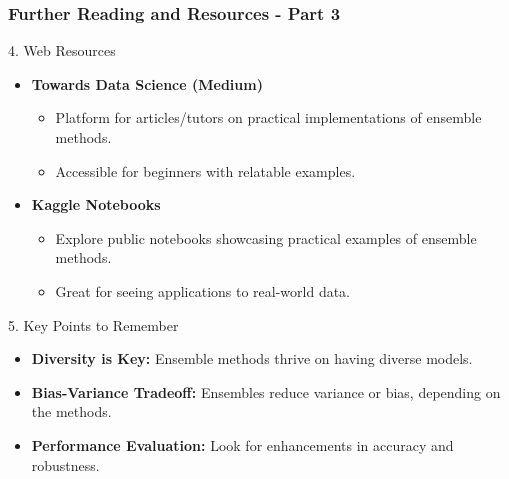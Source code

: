 \documentclass[aspectratio=169]{beamer}
\begin{document}
\begin{frame}[fragile]
  \frametitle{Further Reading and Resources - Part 3}
  \begin{block}{4. Web Resources}
    \begin{itemize}
      \item \textbf{Towards Data Science (Medium)}
        \begin{itemize}
          \item Platform for articles/tutors on practical implementations of ensemble methods.
          \item Accessible for beginners with relatable examples.
        \end{itemize}
      \item \textbf{Kaggle Notebooks}
        \begin{itemize}
          \item Explore public notebooks showcasing practical examples of ensemble methods.
          \item Great for seeing applications to real-world data.
        \end{itemize}
    \end{itemize}
  \end{block}

  \begin{block}{5. Key Points to Remember}
    \begin{itemize}
      \item \textbf{Diversity is Key:} Ensemble methods thrive on having diverse models.
      \item \textbf{Bias-Variance Tradeoff:} Ensembles reduce variance or bias, depending on the methods.
      \item \textbf{Performance Evaluation:} Look for enhancements in accuracy and robustness.
    \end{itemize}
  \end{block}
\end{frame}
\end{document}
